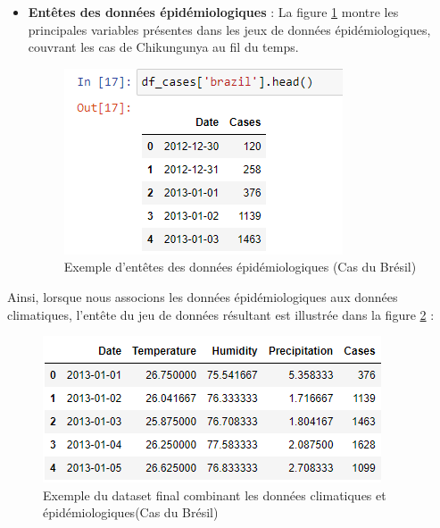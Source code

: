 \begin{itemize}
	\item \textbf{Entêtes des données épidémiologiques} : La figure \ref{fig:casesdatasetsample} montre les principales variables présentes dans les jeux de données épidémiologiques, couvrant les cas de Chikungunya au fil du temps.
	\begin{figure}[h!]
		\centering
		\includegraphics[width=0.7\linewidth]{images/cases_dataset_sample}
		\caption[Exemple d'entêtes des données épidémiologiques]{Exemple d'entêtes des données épidémiologiques (Cas du Brésil)}
		\label{fig:casesdatasetsample}
	\end{figure}
\end{itemize}

Ainsi, lorsque nous associons les données épidémiologiques aux données climatiques, l'entête du jeu de données résultant est illustrée dans la figure \ref{fig:datasetsample} :
\begin{figure}[h!]
	\centering
	\includegraphics[width=0.8\linewidth]{images/dataset_sample}
	\caption{Exemple du dataset final combinant les données climatiques et épidémiologiques(Cas du Brésil)}
	\label{fig:datasetsample}
\end{figure}

